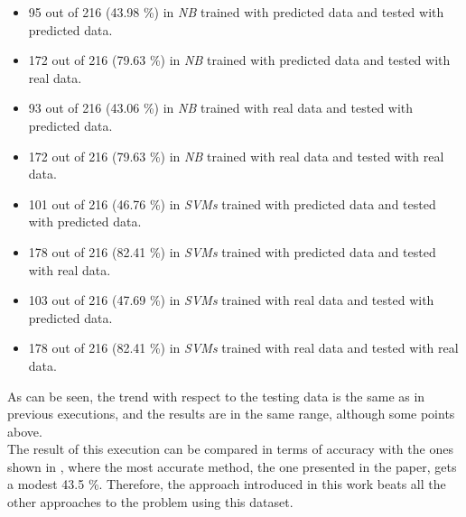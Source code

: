 \begin{itemize}
    \item 95 out of 216 (43.98 \%) in \emph{NB} trained with predicted data and tested with predicted data.
    \item 172 out of 216 (79.63 \%) in \emph{NB} trained with predicted data and tested with real data.
    \item 93 out of 216 (43.06 \%) in \emph{NB} trained with real data and tested with predicted data.
    \item 172 out of 216 (79.63 \%) in \emph{NB} trained with real data and tested with real data.
    \item 101 out of 216 (46.76 \%) in \emph{SVMs} trained with predicted data and tested with predicted data.
    \item 178 out of 216 (82.41 \%) in \emph{SVMs} trained with predicted data and tested with real data.
    \item 103 out of 216 (47.69 \%) in \emph{SVMs} trained with real data and tested with predicted data.
    \item 178 out of 216 (82.41 \%) in \emph{SVMs} trained with real data and tested with real data.
\end{itemize}

As can be seen, the trend with respect to the testing data is the same as in previous executions, and the results are in the same range, although some points above. \\

The result of this execution can be compared in terms of accuracy with the ones shown in \cite{Liao_2013_CVPR}, where the most accurate method, the one presented in the paper, gets a modest 43.5 \%. Therefore, the approach introduced in this work beats all the other approaches to the problem using this dataset. 

